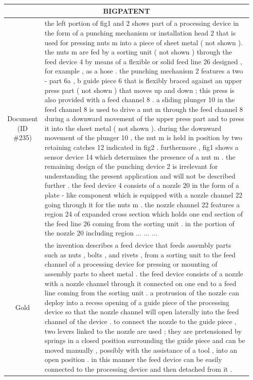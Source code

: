 \begin{table}[bth!]
\scriptsize
\centering
\renewcommand{\arraystretch}{1.3}
\begin{tabular}{c|p{}}
\hline
\multicolumn{2}{c}{BIGPATENT} \\ \hline
\makecell{Document\\(ID \#235)} & 
the left portion of fig1 and 2 shows part of a processing device in the form of a punching mechanism or installation head 2 that is used for pressing nuts m into a piece of sheet metal ( not shown ). the nuts m are fed by a sorting unit ( not shown ) through the feed device 4 by means of a flexible or solid feed line 26 designed , for example , as a hose . the punching mechanism 2 features a two - part 6a , b guide piece 6 that is flexibly braced against an upper press part ( not shown ) that moves up and down ; this press is also provided with a feed channel 8 . a sliding plunger 10 in the feed channel 8 is used to drive a nut m through the feed channel 8 during a downward movement of the upper press part and to press it into the sheet metal ( not shown ). during the downward movement of the plunger 10 , the nut m is held in position by two retaining catches 12 indicated in fig2 . furthermore , fig1 shows a sensor device 14 which determines the presence of a nut m . the remaining design of the punching device 2 is irrelevant for understanding the present application and will not be described further . the feed device 4 consists of a nozzle 20 in the form of a plate - like component which is equipped with a nozzle channel 22 going through it for the nuts m . the nozzle channel 22 features a region 24 of expanded cross section which holds one end section of the feed line 26 coming from the sorting unit . in the portion of the nozzle 20 including region ... ... ... 
\\ \hline
Gold & 
the invention describes a feed device that feeds assembly parts such as nuts , bolts , and rivets , from a sorting unit to the feed channel of a processing device for pressing or mounting of assembly parts to sheet metal . the feed device consists of a nozzle with a nozzle channel through it connected on one end to a feed line coming from the sorting unit . a protrusion of the nozzle can deploy into a recess opening of a guide piece of the processing device so that the nozzle channel will open laterally into the feed channel of the device . to connect the nozzle to the guide piece , two levers linked to the nozzle are used ; they are pretensioned by springs in a closed position surrounding the guide piece and can be moved manually , possibly with the assistance of a tool , into an open position . in this manner the feed device can be easily connected to the processing device and then detached from it .

\end{tabular}
\end{table}
